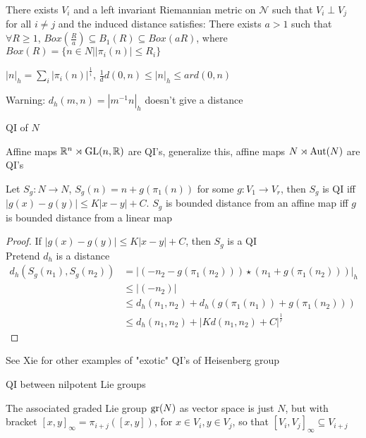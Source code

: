 \documentclass[main]{subfiles}
\begin{document}
\begin{theorem}
There exists $V_i$ and a left invariant Riemannian metric on $\mathscr N$ such that $V_i\perp V_j$ for all $i\neq j$ and the induced distance satisfies: There exists $a>1$ such that $\forall R\geq1$, $Box(\frac{R}{a})\subseteq B_1(R)\subseteq Box(aR)$, where $Box(R)=\{n\in N||\pi_i(n)|\leq R_i\}$
\end{theorem}

\begin{note}
$|n|_h=\sum_{i}|\pi_i(n)|^{\frac{1}{i}}$, $\frac{1}{d}d(0,n)\leq|n|_h\leq ard(0,n)$
\end{note}

Warning: $d_h(m,n)=|m^{-1}n|_h$ doesn't give a distance

QI of $N$

Affine maps $\mathbb R^n\rtimes\operatorname{GL}(n,\mathbb R)$ are QI's, generalize this, affine maps $N\rtimes\operatorname{Aut}(N)$ are QI's

\begin{theorem}[Xie]
Let $S_g:N\to N$, $S_g(n)=n+g(\pi_1(n))$ for some $g:V_1\to V_r$, then $S_g$ is QI iff $|g(x)-g(y)|\leq K|x-y|+C$. $S_g$ is bounded distance from an affine map iff $g$ is bounded distance from a linear map
\end{theorem}

\begin{proof}
If $|g(x)-g(y)|\leq K|x-y|+C$, then $S_g$ is a QI \\

Pretend $d_h$ is a distance
\begin{align*}
d_h(S_g(n_1),S_g(n_2))&=|(-n_2-g(\pi_1(n_2)))\star(n_1+g(\pi_1(n_2)))|_h \\
&\leq|(-n_2)| \\
&\leq d_h(n_1,n_2)+d_h(g(\pi_1(n_1))+g(\pi_1(n_2))) \\
&\leq d_h(n_1,n_2)+|Kd(n_1,n_2)+C|^{\frac{1}{r}}
\end{align*}
\end{proof}

See Xie for other examples of "exotic" QI's of Heisenberg group

QI between nilpotent Lie groups

\begin{definition}
The associated graded Lie group $\operatorname{gr}(N)$ as vector space is just $N$, but with bracket $[x,y]_\infty=\pi_{i+j}([x,y])$, for $x\in V_i,y\in V_j$, so that $[V_i,V_j]_\infty\subseteq V_{i+j}$
\end{definition}
\end{document}
